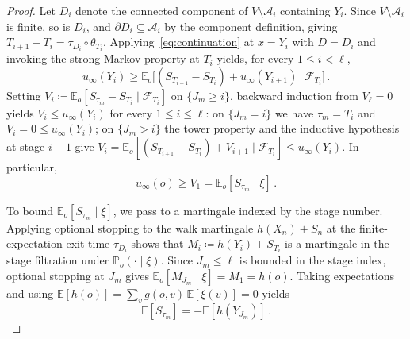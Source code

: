 \documentclass[aop]{imsart}
\theoremstyle{plain}
\theoremstyle{definition}
\newcommand{\E}{\mathbb{E}}
\renewcommand{\P}{\mathbb{P}}
\begin{document}
\begin{proof}
		Let $D_i$ denote the connected component of $V\setminus\mathcal{A}_i$ containing $Y_i$. Since $V\setminus\mathcal{A}_i$ is finite, so is $D_i$, and $\partial D_i\subseteq\mathcal{A}_i$ by the component definition, giving $T_{i+1}-T_i=\tau_{D_i}\circ\theta_{T_i}$. Applying~\eqref{eq:continuation} at $x=Y_i$ with $D=D_i$ and invoking the strong Markov property at $T_i$ yields, for every $1\leq i<\ell$,
		\[
		u_\infty(Y_i)\geq\E_o\bigl[(S_{T_{i+1}}-S_{T_i})+u_\infty(Y_{i+1})\,\big|\,\mathcal{F}_{T_i}\bigr]\,.
		\]
		Setting $V_i\coloneqq\E_o[S_{\tau_m}-S_{T_i}\mid\mathcal{F}_{T_i}]$ on $\{J_m\geq i\}$, backward induction from $V_\ell=0$ yields $V_i\leq u_\infty(Y_i)$ for every $1\leq i\leq\ell$: on $\{J_m=i\}$ we have $\tau_m=T_i$ and $V_i=0\leq u_\infty(Y_i)$; on $\{J_m>i\}$ the tower property and the inductive hypothesis at stage $i+1$ give $V_i=\E_o[(S_{T_{i+1}}-S_{T_i})+V_{i+1}\mid\mathcal{F}_{T_i}]\leq u_\infty(Y_i)$. In particular,
		\begin{equation}\label{eq:stage-bound}
			u_\infty(o)\geq V_1=\E_o[S_{\tau_m}\mid\xi]\,.
		\end{equation}

		To bound $\E_o[S_{\tau_m}\mid\xi]$, we pass to a martingale indexed by the stage number. Applying optional stopping to the walk martingale $h(X_n)+S_n$ at the finite-expectation exit time $\tau_{D_i}$ shows that $M_i\coloneqq h(Y_i)+S_{T_i}$ is a martingale in the stage filtration under $\P_o(\cdot\mid\xi)$. Since $J_m\leq\ell$ is bounded in the stage index, optional stopping at $J_m$ gives $\E_o[M_{J_m}\mid\xi]=M_1=h(o)$. Taking expectations and using $\E[h(o)]=\sum_v g(o,v)\,\E[\xi(v)]=0$ yields
		\begin{equation}\label{eq:payoff-identity}
			\E[S_{\tau_m}]=-\E[h(Y_{J_m})]\,.
		\end{equation}


\end{proof}
\end{document}
